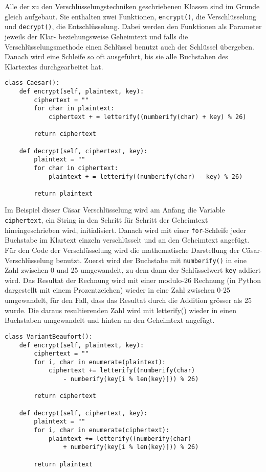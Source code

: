Alle der zu den Verschlüsselungstechniken geschriebenen Klassen sind im Grunde gleich aufgebaut. Sie enthalten zwei Funktionen, \verb+encrypt()+, die Verschlüsselung und \verb+decrypt()+, die Entschlüsselung. Dabei werden den Funktionen als Parameter jeweils der Klar- beziehungsweise Geheimtext und falls die Verschlüsselungsmethode einen Schlüssel benutzt auch der Schlüssel übergeben. Danach wird eine Schleife so oft ausgeführt, bis sie alle Buchstaben des Klartextes durchgearbeitet hat. 

\begin{Verbatim}
class Caesar():
    def encrypt(self, plaintext, key):
        ciphertext = ""
        for char in plaintext:
            ciphertext + = letterify((numberify(char) + key) % 26)

        return ciphertext

    def decrypt(self, ciphertext, key):
        plaintext = "" 
        for char in ciphertext:
            plaintext + = letterify((numberify(char) - key) % 26)

        return plaintext
\end{Verbatim}

Im Beispiel dieser Cäsar Verschlüsselung wird am Anfang die Variable \verb+ciphertext+, ein String in den Schritt für Schritt der Geheimtext hineingeschrieben wird, initialisiert. Danach wird mit einer \verb+for+-Schleife jeder Buchstabe im Klartext einzeln verschlüsselt und an den Geheimtext angefügt. Für den Code der Verschlüsselung wird die mathematische Darstellung der Cäsar-Verschlüsselung benutzt. Zuerst wird der Buchstabe mit \verb+numberify()+ in eine Zahl zwischen 0 und 25 umgewandelt, zu dem dann der Schlüsselwert \verb+key+ addiert wird. Das Resultat der Rechnung wird mit einer modulo-26 Rechnung (in Python dargestellt mit einem Prozentzeichen) wieder in eine Zahl zwischen 0-25 umgewandelt, für den Fall, dass das Resultat durch die Addition grösser als 25 wurde. Die daraus resultierenden Zahl wird mit letterify() wieder in einen Buchstaben umgewandelt und hinten an den Geheimtext angefügt.


\newpage

\begin{Verbatim}
class VariantBeaufort():
    def encrypt(self, plaintext, key):
        ciphertext = ""
        for i, char in enumerate(plaintext):
            ciphertext += letterify((numberify(char) 
				- numberify(key[i % len(key)])) % 26)
        
        return ciphertext

    def decrypt(self, ciphertext, key):
        plaintext = ""
        for i, char in enumerate(ciphertext):
            plaintext += letterify((numberify(char) 
				+ numberify(key[i % len(key)])) % 26)
        
        return plaintext
\end{Verbatim}

